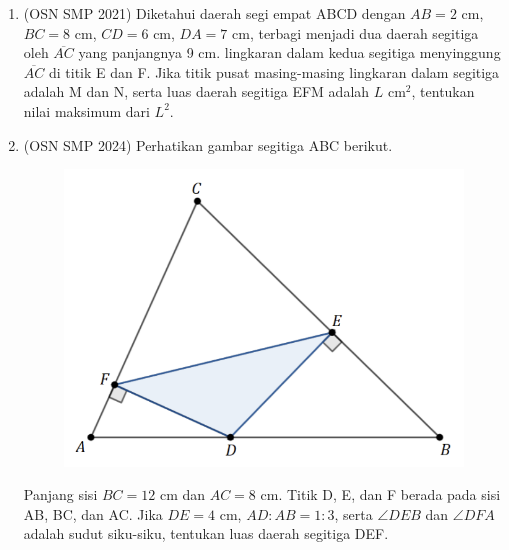 \documentclass[a4paper, 12pt]{article}
\begin{document}
\begin{enumerate}
    \item (OSN SMP 2021) Diketahui daerah segi empat ABCD dengan $AB=2$ cm, $BC=8$ cm, $CD=6$ cm, $DA=7$ cm, terbagi menjadi dua daerah segitiga oleh $\overline{AC}$ yang panjangnya 9 cm. lingkaran dalam kedua segitiga menyinggung $\overline{AC}$ di titik E dan F. Jika titik pusat masing-masing lingkaran dalam segitiga adalah M dan N, serta luas daerah segitiga EFM adalah $L \text{ cm}^{2}$, tentukan nilai maksimum dari $L^{2}$.



    \item (OSN SMP 2024) Perhatikan gambar segitiga ABC berikut.
    \begin{figure}[H]
    \centering
    \includegraphics[scale=0.5]{0Figure/osn-smp-2024-3.png}
    \end{figure}
    Panjang sisi $BC=12$ cm dan $AC=8$ cm. Titik D, E, dan F berada pada sisi AB, BC, dan AC. Jika $DE=4$ cm, $AD:AB=1:3$, serta $\angle DEB$ dan $\angle DFA$ adalah sudut siku-siku, tentukan luas daerah segitiga DEF.


\end{enumerate}
\end{document}
